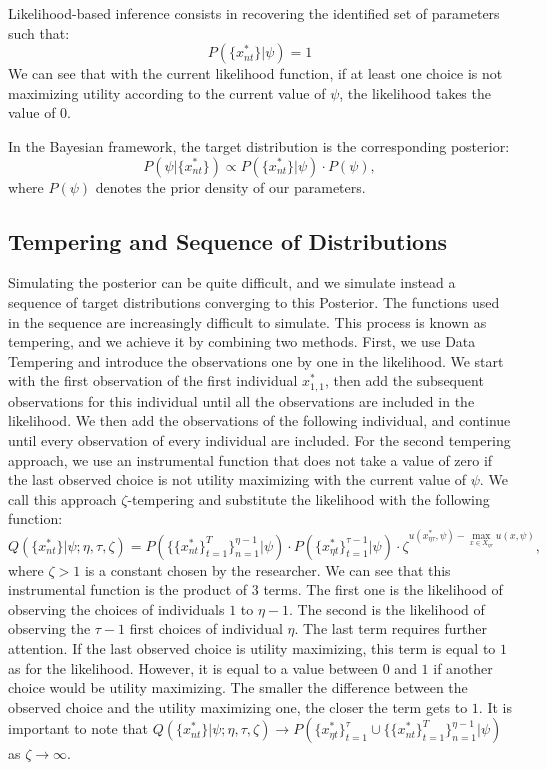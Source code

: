 \documentclass[12pt]{article}
\begin{document}
Likelihood-based inference consists in recovering the identified set of parameters such that: $$P(\{x_{nt}^*\}|\psi) = 1 $$
We can see that with the current likelihood function, if at least one choice is not maximizing utility according to the current value of $\psi$, the likelihood takes the value of $0$.

In the Bayesian framework, the target distribution is the corresponding posterior:
$$  P(\psi|\{x_{nt}^*\}) \propto P(\{x_{nt}^*\}|\psi) \cdot P(\psi),$$
where $P(\psi)$ denotes the prior density of our parameters.

\subsection{Tempering and Sequence of Distributions} 

Simulating the posterior can be quite difficult, and we simulate instead a sequence of target distributions converging to this Posterior. The functions used in the sequence are increasingly difficult to simulate. This process is known as tempering, and we achieve it by combining two methods. First, we use Data Tempering and introduce the observations one by one in the likelihood. We start with the first observation of the first individual $x_{1,1}^*$, then add the subsequent observations for this individual until all the observations are included in the likelihood. We then add the observations of the following individual, and continue until every observation of every individual are included. For the second tempering approach, we use an instrumental function that does not take a value of zero if the last observed choice is not utility maximizing with the current value of $\psi$. We call this approach $\zeta$-tempering and substitute the likelihood with the following function:  
$$Q(\{x_{nt}^*\}|\psi;\eta,\tau,\zeta) = P(\{\{x_{nt}^*\}_{t=1}^T\}_{n=1}^{\eta-1}|\psi) \cdot  P(\{x_{\eta t}^*\}_{t=1}^{\tau-1}|\psi) \cdot \zeta^{ u(x_{\eta \tau}^*,\psi) - \max_{x \in X_{\eta \tau}} u(x,\psi)},$$
where $\zeta>1$ is a constant chosen by the researcher. We can see that this instrumental function is the product of $3$ terms. The first one is the likelihood of observing the choices of individuals $1$ to $\eta-1$. The second is the likelihood of observing the $\tau-1$ first choices of individual $\eta$. The last term requires further attention. If the last observed choice is utility maximizing, this term is equal to $1$ as for the likelihood. However, it is equal to a value between $0$ and $1$ if another choice would be utility maximizing. The smaller the difference between the observed choice and the utility maximizing one, the closer the term gets to $1$. It is important to note that $Q(\{x_{nt}^*\}|\psi;\eta,\tau,\zeta) \to P(\{x_{\eta t}^*\}_{t=1}^\tau \cup \{\{x_{nt}^*\}_{t=1}^T\}_{n=1}^{\eta-1}|\psi)$ as $\zeta \to \infty$. 
\end{document}
